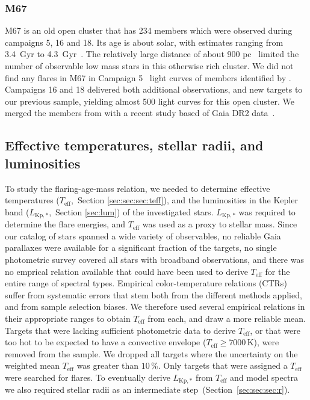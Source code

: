 \documentclass{aa}
\begin{document}
\subsubsection{M67}
M67 is an old open cluster that has 234 members which were observed during campaigns 5, 16 and 18. Its age is about solar, with estimates ranging from 3.4~Gyr to 4.3~Gyr~\citep{salaris_age_2004, onehag2011, dias_fitting_2012, scholz2015, barnes_rotation_2016, bossini2019}. The relatively large distance of about 900 pc~\citep{dias_fitting_2012} limited the number of observable low mass stars in this otherwise rich cluster. We did not find any flares in M67 in Campaign 5~ light curves of members identified by \citet{gonzalez_m67mem_2016}. Campaigns 16 and 18 delivered both additional observations, and new targets to our previous sample, yielding almost 500 light curves for this open cluster. We merged the members from \citet{gonzalez_m67mem_2016} with a recent study based of Gaia DR2 data~\citep{gao_m67mem_2018}.
\subsection{Effective temperatures, stellar radii, and luminosities}
\label{TeffRL}
To study the flaring-age-mass relation, we needed to determine effective temperatures ($T_\mathrm{eff}$,~Section \ref{sec:sec:sec:teff}), and the luminosities in the Kepler band ($L_\mathrm{Kp,*}$,~Section \ref{sec:lum}) of the investigated stars. $L_\mathrm{Kp,*}$ was required to determine the flare energies, and $T_\mathrm{eff}$ was used as a proxy to stellar mass. Since our catalog of stars spanned a wide variety of observables, no reliable Gaia parallaxes were available for a significant fraction of the targets, no single photometric survey covered all stars with broadband observations, and there was no emprical relation available that could have been used to derive $T_\mathrm{eff}$ for the entire range of spectral types. Empirical color-temperature relations (CTRs) suffer from systematic errors that stem both from the different methods applied, and from sample selection biases. We therefore used several empirical relations in their appropriate ranges to obtain $T_\mathrm{eff}$ from each, and draw a more reliable mean. Targets that were lacking sufficient photometric data to derive $T_\mathrm{eff}$, or that were too hot to be expected to have a convective envelope ($T_\mathrm{eff} \geq 7000\,$K), were removed from the sample. We dropped all targets where the uncertainty on the weighted mean $T_\mathrm{eff}$ was greater than $10\,$\%. Only targets that were assigned a $T_\mathrm{eff}$ were searched for flares. To eventually derive $L_\mathrm{Kp,*}$ from $T_\mathrm{eff}$ and model spectra we also required stellar radii as an intermediate step~(Section~\ref{sec:sec:sec:r}).
\end{document}
